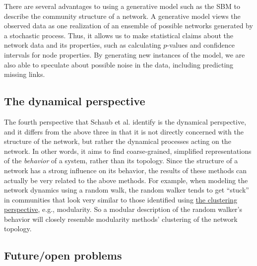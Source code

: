 There are several advantages to using a generative model such as the SBM
to describe the community structure of a network. A generative model
views the observed data as one realization of an ensemble of possible
networks generated by a stochastic process. Thus, it allows us to make
statistical claims about the network data and its properties, such as
calculating \(p\)-values and confidence intervals for node properties.
By generating new instances of the model, we are also able to speculate
about possible noise in the data, including predicting missing links.

\hypertarget{the-dynamical-perspective}{\subsection{The dynamical
perspective}\label{the-dynamical-perspective}}

The fourth perspective that Schaub et al. identify is the dynamical
perspective, and it differs from the above three in that it is not
directly concerned with the structure of the network, but rather the
dynamical processes acting on the network. In other words, it aims to
find coarse-grained, simplified representations of the \emph{behavior}
of a system, rather than its topology. Since the structure of a network
has a strong influence on its behavior, the results of these methods can
actually be very related to the above methods. For example, when
modeling the network dynamics using a random walk, the random walker
tends to get ``stuck'' in communities that look very similar to those
identified using \protect\hyperlink{the-clustering-perspective}{the
clustering perspective}, e.g., modularity. So a modular description of
the random walker's behavior will closely resemble modularity methods'
clustering of the network topology.

\subsection{Future/open problems}\label{futureopen-problems}

